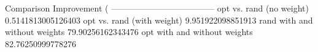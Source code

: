 Comparison	Improvement (%
------------------------------------
opt vs. rand (no weight)	0.5141813005126403
opt vs. rand (with weight)	9.951922098851913
rand with and without weights	79.90256162343476
opt with and without weights	82.76250999778276
